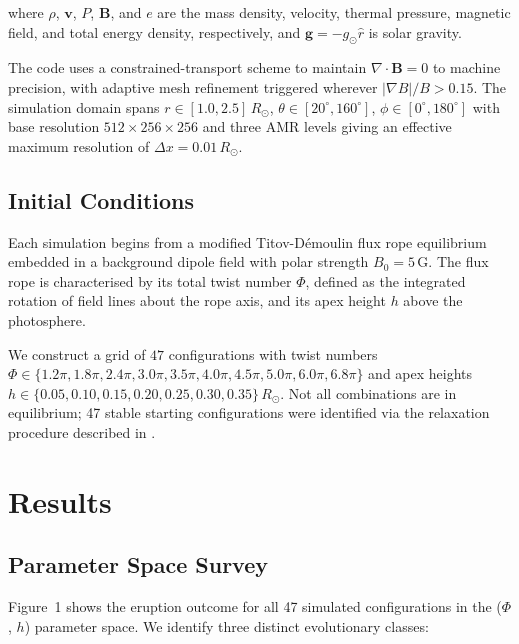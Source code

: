 \documentclass[twocolumn]{aastex631}
\begin{document}
where $\rho$, $\mathbf{v}$, $P$, $\mathbf{B}$, and $e$ are the mass density,
velocity, thermal pressure, magnetic field, and total energy density, respectively,
and $\mathbf{g} = -g_\odot \hat{r}$ is solar gravity.

The code uses a constrained-transport scheme to maintain $\nabla \cdot \mathbf{B} = 0$
to machine precision, with adaptive mesh refinement triggered wherever
$|\nabla B| / B > 0.15$. The simulation domain spans
$r \in [1.0, 2.5]\,R_\odot$, $\theta \in [20^\circ, 160^\circ]$,
$\phi \in [0^\circ, 180^\circ]$ with base resolution $512 \times 256 \times 256$ and
three AMR levels giving an effective maximum resolution of $\Delta x = 0.01\,R_\odot$.

\subsection{Initial Conditions}
\label{sec:init}

Each simulation begins from a modified Titov-D\'emoulin flux rope equilibrium
\citep{Titov1999} embedded in a background dipole field with polar strength
$B_0 = 5$\,G. The flux rope is characterised by its total twist number $\Phi$,
defined as the integrated rotation of field lines about the rope axis, and its
apex height $h$ above the photosphere.

We construct a grid of $47$ configurations with twist numbers
$\Phi \in \{1.2\pi, 1.8\pi, 2.4\pi, 3.0\pi, 3.5\pi, 4.0\pi, 4.5\pi, 5.0\pi, 6.0\pi, 6.8\pi\}$
and apex heights $h \in \{0.05, 0.10, 0.15, 0.20, 0.25, 0.30, 0.35\}\,R_\odot$.
Not all combinations are in equilibrium; 47 stable starting configurations were
identified via the relaxation procedure described in \citet{Vega2025}.

\section{Results}
\label{sec:results}

\subsection{Parameter Space Survey}
\label{sec:survey}

Figure~1 shows the eruption outcome for all 47 simulated configurations in the
($\Phi$, $h$) parameter space. We identify three distinct evolutionary classes:
\end{document}
